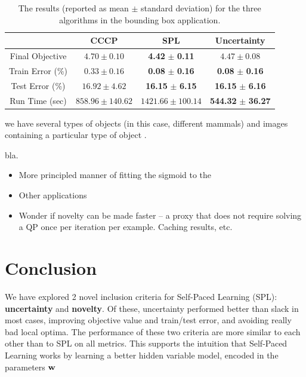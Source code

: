 \documentclass{article}
\begin{document}
\begin{table}
\caption{The results (reported as mean $\pm$ standard deviation) for the three algorithms in the bounding box application. }
\begin{center}
\begin{tabular}{|c|c|c|c|}
\hline  & CCCP & SPL & Uncertainty \\\hline
Final Objective & $4.70 \pm 0.10$ & \textbf{4.42} $\pm$ \textbf{0.11} & $4.47 \pm 0.08$ \\\hline
Train Error (\%) & $0.33 \pm 0.16$ & \textbf{0.08} $\pm$ \textbf{0.16} & \textbf{0.08} $\pm$ \textbf{0.16}  \\ \hline
Test Error (\%) & $16.92 \pm 4.62$ & \textbf{16.15} $\pm$ \textbf{6.15} & \textbf{16.15} $\pm$ \textbf{6.16} \\ \hline
Run Time (sec) & $858.96 \pm 140.62$ & $1421.66 \pm 100.14$ & \textbf{544.32} $\pm$ \textbf{36.27} \\ \hline
\end{tabular}
\end{center}
\label{tbl:bbox}
\end{table}

we have several types of objects (in this case, different mammals) and 
 images containing a particular type of object .

bla.
\begin{itemize}
\item More principled manner of fitting the sigmoid to the 
\item Other applications
\item Wonder if novelty can be made faster -- a proxy that does not require solving a QP once per iteration per example. Caching results, etc.
\end{itemize}

\section{Conclusion}

We have explored 2 novel inclusion criteria for Self-Paced Learning ({\sc SPL}): \textbf{uncertainty} and \textbf{novelty}.  Of these, uncertainty performed better than slack in most cases, improving objective value and train/test error, and avoiding really bad local optima.  The performance of these two criteria are more similar to each other than to SPL on all metrics.  This supports the intuition that Self-Paced Learning works by learning a better hidden variable model, encoded in the parameters $\bf w$
\end{document}
